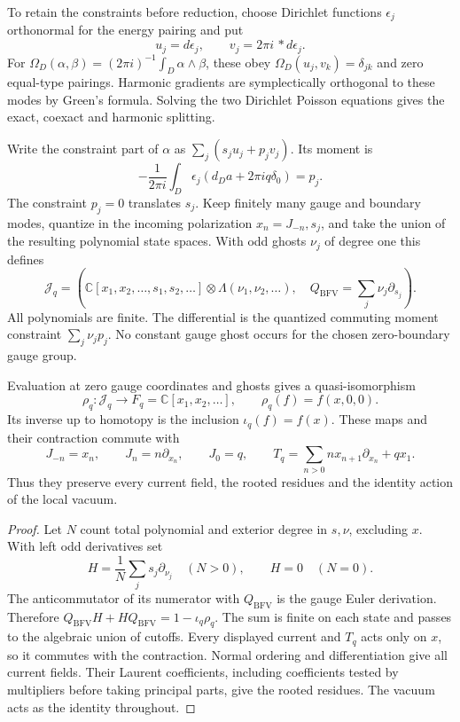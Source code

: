 To retain the constraints before reduction, choose Dirichlet functions
\(\epsilon_j\) orthonormal for the energy pairing and put
\[
 u_j=d\epsilon_j,\qquad v_j=2\pi i\,*d\epsilon_j.
\]
For \(\Omega_D(\alpha,\beta)=(2\pi i)^{-1}\int_D\alpha\wedge\beta\),
these obey \(\Omega_D(u_j,v_k)=\delta_{jk}\) and zero equal-type pairings.
Harmonic gradients are symplectically orthogonal to these modes by
Green's formula. Solving the two Dirichlet Poisson equations gives the
exact, coexact and harmonic splitting.

Write the constraint part of \(\alpha\) as \(\sum_j(s_ju_j+p_jv_j)\).
Its moment is
\[
 -\frac1{2\pi i}\int_D\epsilon_j(d_Da+2\pi iq\delta_0)=p_j.
\]
The constraint \(p_j=0\) translates \(s_j\).
Keep finitely many gauge and boundary modes, quantize in the incoming
polarization \(x_n=J_{-n},s_j\), and take the union of the resulting
polynomial state spaces. With odd ghosts \(\nu_j\) of degree one this
defines
\begin{equation}\label{eq:vol2-native-bfv-junction}
 \mathcal J_q=
 \left(\mathbb C[x_1,x_2,\ldots,s_1,s_2,\ldots]
          \otimes\Lambda(\nu_1,\nu_2,\ldots),
       \quad Q_{\mathrm{BFV}}=\sum_j\nu_j\partial_{s_j}\right).
\end{equation}
All polynomials are finite. The differential is the quantized commuting
moment constraint \(\sum_j\nu_jp_j\). No constant gauge ghost occurs for
the chosen zero-boundary gauge group.

\begin{theorem}\label{thm:vol2-native-polynomial-junction}
Evaluation at zero gauge coordinates and ghosts gives a quasi-isomorphism
\[
 \rho_q:\mathcal J_q\longrightarrow F_q=\mathbb C[x_1,x_2,\ldots],
 \qquad \rho_q(f)=f(x,0,0).
\]
Its inverse up to homotopy is the inclusion \(\iota_q(f)=f(x)\).
These maps and their contraction commute with
\[
 J_{-n}=x_n,\qquad J_n=n\partial_{x_n},\qquad J_0=q,
 \qquad T_q=\sum_{n>0}n x_{n+1}\partial_{x_n}+qx_1.
\]
Thus they preserve every current field, the rooted residues and the
identity action of the local vacuum.
\end{theorem}

\begin{proof}
Let \(N\) count total polynomial and exterior degree in \(s,\nu\),
excluding \(x\). With left odd derivatives set
\[
 H=\frac1N\sum_js_j\partial_{\nu_j}\quad(N>0),\qquad H=0\quad(N=0).
\]
The anticommutator of its numerator with \(Q_{\mathrm{BFV}}\) is the
gauge Euler derivation. Therefore
\(Q_{\mathrm{BFV}}H+HQ_{\mathrm{BFV}}=1-\iota_q\rho_q\).
The sum is finite on each state and passes to the algebraic union of
cutoffs. Every displayed current and \(T_q\) acts only on \(x\), so it
commutes with the contraction. Normal ordering and differentiation give
all current fields. Their Laurent coefficients, including coefficients
tested by multipliers before taking principal parts, give the rooted
residues. The vacuum acts as the identity throughout.
\end{proof}

